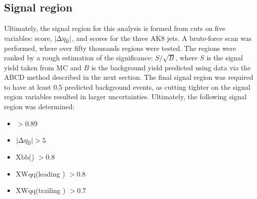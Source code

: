\subsection{Signal region}
Ultimately, the signal region for this analysis is formed from cuts on five variables: \ABCDNet score, $|\Delta\eta_{\mathrm{j}\mathrm{j}}|$, and \ParticleNet scores for the three AK8 jets. 
A brute-force scan was performed, where over fifty thousands regions were tested. 
The regions were ranked by a rough estimation of the significance: $S/\sqrt{B}$, where $S$ is the signal yield taken from MC and $B$ is the background yield predicted using data via the ABCD method described in the next section.
The final signal region was required to have at least 0.5 predicted background events, as cutting tighter on the signal region variables resulted in larger uncertainties. 
Ultimately, the following signal region was determined:
\begin{itemize}
    \item \ABCDNet $> 0.89$
    \item $|\Delta\eta_{\mathrm{j}\mathrm{j}}| > 5$
    \item Xbb(\Htobb) $> 0.8$
    \item XWqq(leading \Vtoqq) $> 0.8$
    \item XWqq(trailing \Vtoqq) $> 0.7$
\end{itemize}

